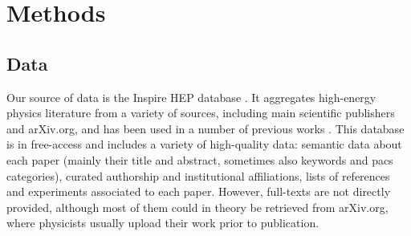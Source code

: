 \documentclass{article}
\begin{document}



\section{\label{sec:methods}Methods}

\subsection{\label{sec:data}Data}

Our source of data is the Inspire HEP database \citep{InspireAPI}. It aggregates high-energy physics literature from a variety of sources, including main scientific publishers and arXiv.org, and has been used in a number of previous works \citep{Perovi2016,Strumia2021,Sikimi2022,Gautheron2023}. This database is in free-access and includes a variety of high-quality data: semantic data about each paper (mainly their title and abstract, sometimes also keywords and \gls{pacs} categories), curated authorship and institutional affiliations, lists of references and experiments associated to each paper. However, full-texts are not directly provided, although most of them could in theory be retrieved from arXiv.org, where physicists usually upload their work prior to publication.
\end{document}
